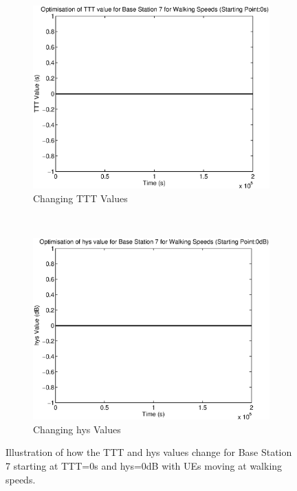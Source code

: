 \begin{figure}[H]
        \centering
        \begin{subfigure}[b]{0.49\textwidth}
                \includegraphics[width=\textwidth]{figures/graphs/walklow/TTT7.eps}
                \caption{Changing TTT Values}
        \end{subfigure}%
        ~ %
        \begin{subfigure}[b]{0.49\textwidth}
                \includegraphics[width=\textwidth]{figures/graphs/walklow/hys7.eps}
                \caption{Changing hys Values}
        \end{subfigure}
        \caption{Illustration of how the TTT and hys values change for Base Station 7 starting at TTT=0s and hys=0dB with UEs moving at walking speeds.}
\end{figure}
